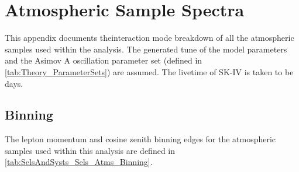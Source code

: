\chapter{Atmospheric Sample Spectra}
\label{chap:AppendixA}

This appendix documents theinteraction mode breakdown of all the atmospheric samples used within the analysis. The generated tune of the model parameters and the Asimov A oscillation parameter set (defined in \autoref{tab:Theory_ParameterSets}) are assumed. The livetime of SK-IV is taken to be  days.

\section{Binning}

The lepton momentum and cosine zenith binning edges for the atmospheric samples used within this analysis are defined in \autoref{tab:SelsAndSysts_Sels_Atms_Binning}. 


